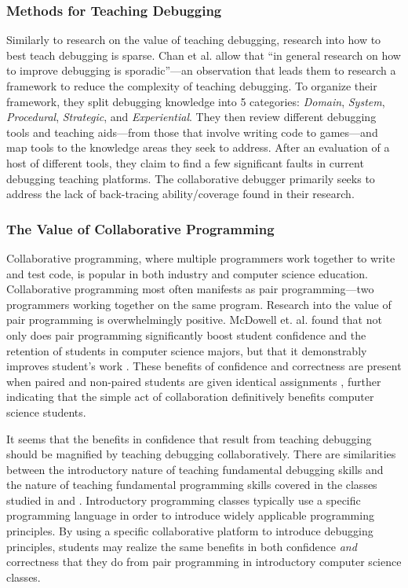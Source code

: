 \documentclass[12pt]{article}
\begin{document}
\subsubsection{Methods for Teaching Debugging}

Similarly to research on the value of teaching debugging, research
into how to best teach debugging is sparse.  Chan et al. allow that
``in general research on how to improve debugging is sporadic''---an
observation that leads them to research a framework to reduce the
complexity of teaching debugging\cite{10.1145/3286960.3286970}.  To
organize their framework, they split debugging knowledge into 5
categories: \textit{Domain}, \textit{System}, \textit{Procedural},
\textit{Strategic}, and \textit{Experiential}.  They then review
different debugging tools and teaching aids---from those that involve
writing code to games---and map tools to the knowledge areas they seek
to address.  After an evaluation of a host of different tools, they
claim to find a few significant faults in current debugging teaching
platforms.  The collaborative debugger primarily seeks to address the
lack of back-tracing ability/coverage found in their research.

\subsubsection{The Value of Collaborative Programming}

Collaborative programming, where multiple programmers work together to
write and test code, is popular in both industry and computer science
education\cite{10.1145/1145287.1145293}. Collaborative programming
most often manifests as pair programming---two programmers working
together on the same program.  Research into the value of pair
programming is overwhelmingly positive.  McDowell et. al. found that
not only does pair programming significantly boost student confidence
and the retention of students in computer science majors, but that it
demonstrably improves student's work \cite{10.1145/1145287.1145293}.
These benefits of confidence and correctness are present when paired
and non-paired students are given identical assignments
\cite{10.1145/1026487.1008043}, further indicating that the simple act
of collaboration definitively benefits computer science students.
\par

It seems that the benefits in confidence that result from teaching
debugging should be magnified by teaching debugging collaboratively.
There are similarities between the introductory nature of teaching
fundamental debugging skills and the nature of teaching fundamental
programming skills covered in the classes studied in
\cite{10.1145/1026487.1008043} and \cite{10.1145/1145287.1145293}.
Introductory programming classes typically use a specific programming
language in order to introduce widely applicable programming
principles.  By using a specific collaborative platform to introduce
debugging principles, students may realize the same benefits in both
confidence \textit{and} correctness that they do from pair programming
in introductory computer science classes.
\par
\end{document}
